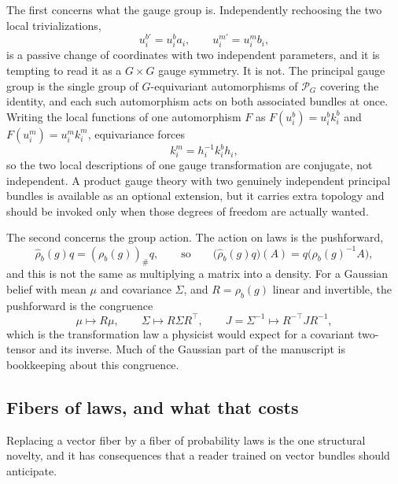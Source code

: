 \documentclass[11pt,letterpaper]{article}
\begin{document}
The first concerns what the gauge group is. Independently rechoosing the two local trivializations,
\begin{equation}
  u_i^{b\prime}=u_i^b a_i,
  \qquad
  u_i^{m\prime}=u_i^m b_i,
  \label{eq:reframing}
\end{equation}
is a passive change of coordinates with two independent parameters, and it is tempting to read it as a \(G\times G\) gauge symmetry. It is not. The principal gauge group is the single group of \(G\)-equivariant automorphisms of \(\mathscr P_G\) covering the identity, and each such automorphism acts on both associated bundles at once. Writing the local functions of one automorphism \(F\) as \(F(u_i^b)=u_i^b k_i^b\) and \(F(u_i^m)=u_i^m k_i^m\), equivariance forces
\begin{equation}
  k_i^m=h_i^{-1}k_i^b h_i,
  \label{eq:diagonal-gauge}
\end{equation}
so the two local descriptions of one gauge transformation are conjugate, not independent. A product gauge theory with two genuinely independent principal bundles is available as an optional extension, but it carries extra topology and should be invoked only when those degrees of freedom are actually wanted.

The second concerns the group action. The action on laws is the pushforward,
\begin{equation}
  \widehat\rho_b(g)q=(\rho_b(g))_{\#}q,
  \qquad\text{so}\qquad
  \bigl(\widehat\rho_b(g)q\bigr)(A)=q\bigl(\rho_b(g)^{-1}A\bigr),
  \label{eq:pushforward-action}
\end{equation}
and this is not the same as multiplying a matrix into a density. For a Gaussian belief with mean \(\mu\) and covariance \(\Sigma\), and \(R=\rho_b(g)\) linear and invertible, the pushforward is the congruence
\begin{equation}
  \mu\mapsto R\mu,
  \qquad
  \Sigma\mapsto R\Sigma R^\top,
  \qquad
  J=\Sigma^{-1}\mapsto R^{-\top}JR^{-1},
  \label{eq:congruence}
\end{equation}
which is the transformation law a physicist would expect for a covariant two-tensor and its inverse. Much of the Gaussian part of the manuscript is bookkeeping about this congruence.

\subsection{Fibers of laws, and what that costs}

Replacing a vector fiber by a fiber of probability laws is the one structural novelty, and it has consequences that a reader trained on vector bundles should anticipate.
\end{document}
